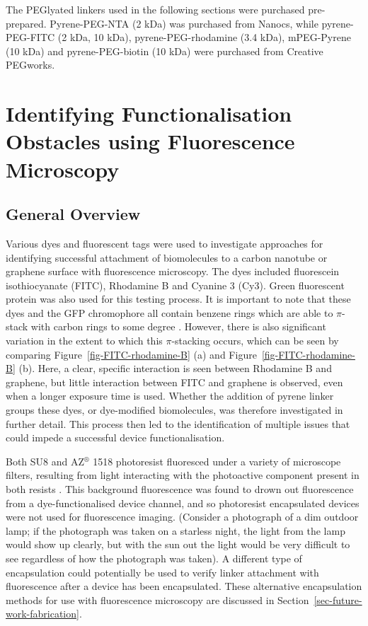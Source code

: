 \documentclass[
  a4paper,
]{scrbook}
\begin{document}
The PEGlyated linkers used in the following sections were purchased
pre-prepared. Pyrene-PEG-NTA (2 kDa) was purchased from Nanocs, while
pyrene-PEG-FITC (2 kDa, 10 kDa), pyrene-PEG-rhodamine (3.4 kDa),
mPEG-Pyrene (10 kDa) and pyrene-PEG-biotin (10 kDa) were purchased from
Creative PEGworks.

\hypertarget{sec-impediments}{%
\section{Identifying Functionalisation Obstacles using Fluorescence
Microscopy}\label{sec-impediments}}

\hypertarget{sec-fluorescence-remarks}{%
\subsection{General Overview}\label{sec-fluorescence-remarks}}

Various dyes and fluorescent tags were used to investigate approaches
for identifying successful attachment of biomolecules to a carbon
nanotube or graphene surface with fluorescence microscopy. The dyes
included fluorescein isothiocyanate (FITC), Rhodamine B and Cyanine 3
(Cy3). Green fluorescent protein was also used for this testing process.
It is important to note that these dyes and the GFP chromophore all
contain benzene rings which are able to \(\pi\)-stack with carbon rings
to some degree
\autocite{Nakayama-Ratchford2007,Tang2012,Khrenova2019,Qiu2019}.
However, there is also significant variation in the extent to which this
\(\pi\)-stacking occurs, which can be seen by comparing
Figure~\ref{fig-FITC-rhodamine-B} (a) and
Figure~\ref{fig-FITC-rhodamine-B} (b). Here, a clear, specific
interaction is seen between Rhodamine B and graphene, but little
interaction between FITC and graphene is observed, even when a longer
exposure time is used. Whether the addition of pyrene linker groups
these dyes, or dye-modified biomolecules, was therefore investigated in
further detail. This process then led to the identification of multiple
issues that could impede a successful device functionalisation.

Both SU8 and AZ\(^\circledR\) 1518 photoresist fluoresced under a
variety of microscope filters, resulting from light interacting with the
photoactive component present in both resists \autocite{Pai2007}. This
background fluorescence was found to drown out fluorescence from a
dye-functionalised device channel, and so photoresist encapsulated
devices were not used for fluorescence imaging. (Consider a photograph
of a dim outdoor lamp; if the photograph was taken on a starless night,
the light from the lamp would show up clearly, but with the sun out the
light would be very difficult to see regardless of how the photograph
was taken). A different type of encapsulation could potentially be used
to verify linker attachment with fluorescence after a device has been
encapsulated. These alternative encapsulation methods for use with
fluorescence microscopy are discussed in
Section~\ref{sec-future-work-fabrication}.
\end{document}
